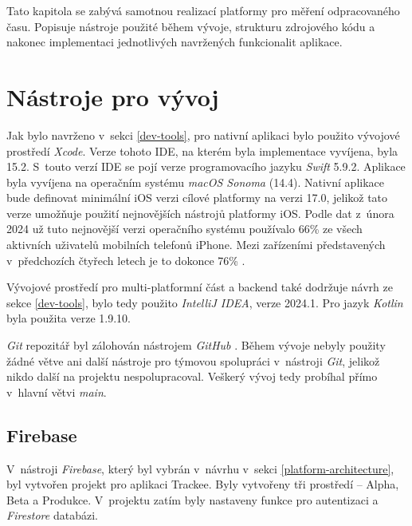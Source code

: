 Tato kapitola se zabývá samotnou realizací platformy pro měření odpracovaného času. Popisuje nástroje použité během vývoje, strukturu zdrojového kódu a nakonec implementaci jednotlivých navržených funkcionalit aplikace.

\section{Nástroje pro vývoj}\label{development-tools}

Jak bylo navrženo v~sekci \ref{dev-tools}, pro nativní aplikaci bylo použito vývojové prostředí \emph{Xcode}. Verze tohoto IDE, na kterém byla implementace vyvíjena, byla 15.2. S~touto verzí IDE se pojí verze programovacího jazyku \emph{Swift} 5.9.2. Aplikace byla vyvíjena na operačním systému \emph{macOS Sonoma} (14.4). Nativní aplikace bude definovat minimální iOS verzi cílové platformy na verzi 17.0, jelikož tato verze umožňuje použití nejnovějších nástrojů platformy iOS. Podle dat z~února 2024 už tuto nejnovější verzi operačního systému používalo 66\% ze všech aktivních uživatelů mobilních telefonů iPhone. Mezi zařízeními představených v~předchozích čtyřech letech je to dokonce 76\% \cite{ios-17-adoption}.

Vývojové prostředí pro multi-platformní část a backend také dodržuje návrh ze sekce \ref{dev-tools}, bylo tedy použito \emph{IntelliJ IDEA}, verze 2024.1. Pro jazyk \emph{Kotlin} byla použita verze 1.9.10. 

\emph{Git} repozitář byl zálohován nástrojem \emph{GitHub} \cite{github}. Během vývoje nebyly použity žádné větve ani další nástroje pro týmovou spolupráci v~nástroji \emph{Git}, jelikož nikdo další na projektu nespolupracoval. Veškerý vývoj tedy probíhal přímo v~hlavní větvi \emph{main}.

\subsection{Firebase}

V~nástroji \emph{Firebase}, který byl vybrán v~návrhu v~sekci \ref{platform-architecture}, byl vytvořen projekt pro aplikaci Trackee. Byly vytvořeny tři prostředí – Alpha, Beta a Produkce. V~projektu zatím byly nastaveny funkce pro autentizaci a \emph{Firestore} databázi. 


